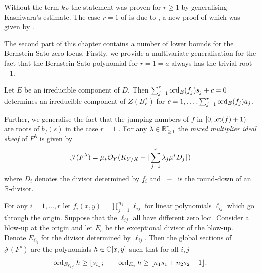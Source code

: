 Without the term $k_E$ the statement was proven for $r\ge 1$ by \cite[Lemma 4.4.6]{budur2020zeroII} generalising Kashiwara's estimate.
The case $r=1$ of  is due to \cite{lichtin1989poles}, a new proof of which was given by \cite{DM}.

The second part of this chapter contains a number of lower bounds for the Bernstein-Sato zero locus.
Firstly, we provide a multivariate generalisation for the fact that the Bernstein-Sato polynomial for $r=1=a$ always has the trivial root $-1$.
\begin{proposition}
  Let $E$ be an irreducible component of $D$.
  Then $\sum_{j=1}^r \operatorname{ord}_{E}(f_j)s_j + c = 0$ determines an irreducible component of $Z(B_F^a)$ for $c = 1,\ldots, \sum_{j=1}^{r}\operatorname{ord}_{E}(f_j)a_j$.
\end{proposition}
Further, we generalise the fact that the jumping numbers of $f$ in $[0,\operatorname{lct}(f)+1)$ are roots of $b_{f}(s)$ in the case $r=1$ \cite[Theorem 2]{BSArbitraryVariety}.
For any $\lambda\in \mathbb{R}_{\geq 0}^r$ the {\it mixed multiplier ideal sheaf} of $F^\lambda$ is given by
$$\mathcal{J}(F^\lambda) = \mu_*\mathcal{O}_Y(K_{Y/X} - \lfloor \sum_{j=1}^r \lambda_j \mu^* D_j \rfloor)$$
where $D_i$ denotes the divisor determined by $f_i$ and $\lfloor {-} \rfloor$ is the round-down of an $\mathbb{R}$-divisor.
\begin{example}
  For any $i=1,\ldots,r$ let $f_i(x,y) = \prod_{j=1}^{n_1} \ell_{ij}$ for linear polynomials $\ell_{ij}$ which go through the origin.
  Suppose that the $\ell_{ij}$ all have different zero loci.
  Consider a blow-up at the origin and let $E_{e}$ be the exceptional divisor of the blow-up.
  Denote $E_{\ell_{ij}}$ for the divisor determined by $\ell_{ij}$.
  Then the global sections of $\mathcal{J}(F^s)$ are the polynomials $h\in \mathbb{C}[x,y]$ such that for all $i,j$
  $$\operatorname{ord}_{E_{\ell_{ij}}} h\geq \lfloor s_i \rfloor;\qquad \operatorname{ord}_{E_{e}} h \geq \lfloor n_1s_1 + n_2s_2 - 1 \rfloor. $$
\end{example}

